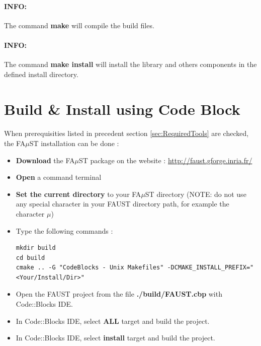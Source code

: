 \paragraph{INFO:}The command \textbf{make} will compile the build files.

\paragraph{INFO:}The command \textbf{make install} will install the library and others components in the defined install directory. 






\section{Build \& Install using Code Block}\label{sec:UnixInstallCodeBlock}
\paragraph{}When prerequisities listed in precedent section \ref{sec:RequiredTools} are checked, the FA$\mu$ST installation can be done : 

\begin{itemize}
\item \textbf{Download} the FA$\mu$ST package on the website :  \url{http://faust.gforge.inria.fr/}
\item \textbf{Open} a command terminal
\item \textbf{Set the current directory} to your FA$\mu$ST directory (NOTE: do not use any special character in your FAUST directory path, for example the character $\mu$)
\item Type the following commands : 
\begin{lstlisting}
mkdir build
cd build
cmake .. -G "CodeBlocks - Unix Makefiles" -DCMAKE_INSTALL_PREFIX="<Your/Install/Dir>"
\end{lstlisting}

\item Open the FAUST project from the file \textbf{./build/FAUST.cbp} with Code::Blocks IDE. 
\item In Code::Blocks IDE, select \textbf{ALL} target and build the project. 
\item In Code::Blocks IDE, select \textbf{install} target and build the project. 
\end{itemize}

